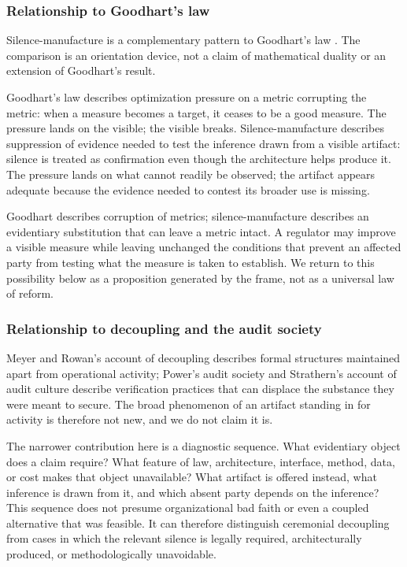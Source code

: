 \subsubsection{Relationship to Goodhart's law}
\label{sec:diagnostics:silence-manufacture:goodhart}

Silence-manufacture is a complementary pattern to Goodhart's law \parencite{goodhart1984problems}. The comparison is an orientation device, not a claim of mathematical duality or an extension of Goodhart's result.

Goodhart's law describes optimization pressure on a metric corrupting the metric: when a measure becomes a target, it ceases to be a good measure. The pressure lands on the visible; the visible breaks. Silence-manufacture describes suppression of evidence needed to test the inference drawn from a visible artifact: silence is treated as confirmation even though the architecture helps produce it. The pressure lands on what cannot readily be observed; the artifact appears adequate because the evidence needed to contest its broader use is missing.

Goodhart describes corruption of metrics; silence-manufacture describes an evidentiary substitution that can leave a metric intact. A regulator may improve a visible measure while leaving unchanged the conditions that prevent an affected party from testing what the measure is taken to establish. We return to this possibility below as a proposition generated by the frame, not as a universal law of reform.

\subsubsection{Relationship to decoupling and the audit society}
\label{sec:diagnostics:silence-manufacture:decoupling}

Meyer and Rowan's account of decoupling describes formal structures maintained
apart from operational activity; Power's audit society and Strathern's account
of audit culture describe verification practices that can displace the
substance they were meant to secure. The broad phenomenon of an artifact
standing in for activity is therefore not new, and we do not claim it is.

The narrower contribution here is a diagnostic sequence. What evidentiary
object does a claim require? What feature of law, architecture, interface,
method, data, or cost makes that object unavailable? What artifact is offered
instead, what inference is drawn from it, and which absent party depends on the
inference? This sequence does not presume organizational bad faith or even a
coupled alternative that was feasible. It can therefore distinguish ceremonial
decoupling from cases in which the relevant silence is legally required,
architecturally produced, or methodologically unavoidable.


